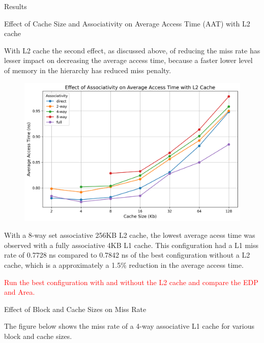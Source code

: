 \begin{section}{Results}
   


    \begin{subsection}{Effect of Cache Size and Associativity on Average Access Time (AAT) with L2 cache}
    
        With L2 cache the second effect, as discussed above, of reducing the miss rate has lesser impact on decreasing the average access time, because a faster lower level of memory in the hierarchy has reduced miss penalty.
        
        \begin{figure}[h]
            \includegraphics[width=\textwidth]{figures/fig3/fig3.png}
            \centering
            \label{fig:fig3}
        \end{figure}

        With a 8-way set associative 256KB L2 cache, the lowest average acess time was observed with a fully associative 4KB L1 cache. This configuration had a L1 miss rate of 0.7728 ns compared to 0.7842 ns of the best configuration without a L2 cache, which is a approximately a 1.5\% reduction in the average access time.

        \textcolor{red}{Run the best configuration with and without the L2 cache and compare the EDP and Area.}
        
    
    \end{subsection}

   
    \begin{subsection}{Effect of Block and Cache Sizes on Miss Rate}

    The figure below shows the miss rate of a 4-way associative L1 cache for various block and cache sizes.


\end{subsection}
\end{section}
